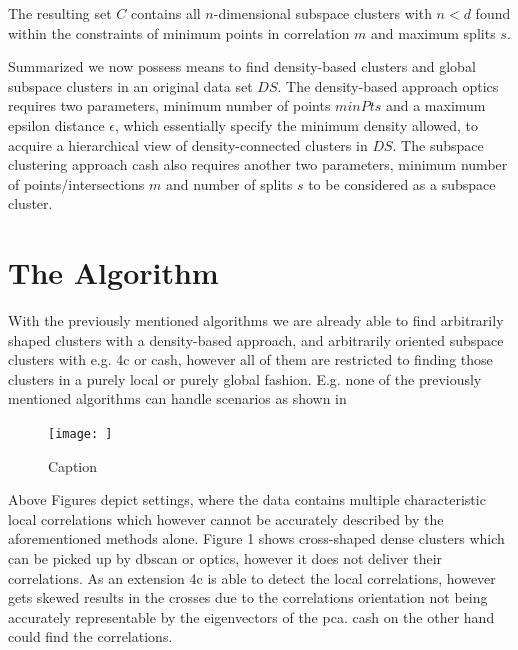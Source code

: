 The resulting set $C$ contains all $n$-dimensional subspace clusters with $n < d$ found within the constraints of minimum points in correlation $m$ and maximum splits $s$.

Summarized we now possess means to find density-based clusters and global subspace clusters in an original data set $DS$. The density-based approach \gls{optics} requires two parameters, minimum number of points $minPts$ and a maximum epsilon distance $\epsilon$, which essentially specify the minimum density allowed, to acquire a hierarchical view of density-connected clusters in $DS$. The subspace clustering approach \gls{cash} also requires another two parameters, minimum number of points/intersections $m$ and number of splits $s$ to be considered as a subspace cluster.

\section{The Algorithm}
With the previously mentioned algorithms we are already able to find arbitrarily shaped clusters with a density-based approach, and arbitrarily oriented subspace clusters with e.g. \gls{4c} or \gls{cash}, however all of them are restricted to finding those clusters in a purely local or purely global fashion. E.g. none of the previously mentioned algorithms can handle scenarios as shown in 
\begin{figure}
    \centering
    \texttt{[image: ]}
    \caption{Caption}
    \label{fig:}
\end{figure}
Above Figures  depict settings, where the data contains multiple characteristic local correlations which however cannot be accurately described by the aforementioned methods alone. Figure 1 shows cross-shaped dense clusters which can be picked up by \gls{dbscan} or \gls{optics}, however it does not deliver their correlations. As an extension \gls{4c} is able to detect the local correlations, however gets skewed results in the crosses due to the correlations orientation not being accurately representable by the eigenvectors of the \gls{pca}\cite{PCAshlens2014tutorial}. 
\gls{cash} on the other hand could find the correlations. 

